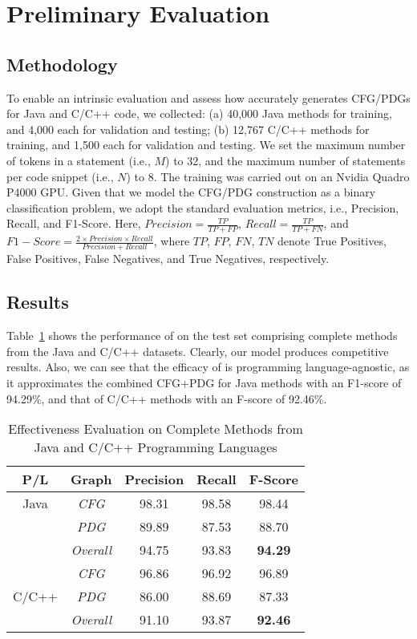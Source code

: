 \section{Preliminary Evaluation}
\subsection{Methodology}
To enable an intrinsic evaluation and assess how accurately \tool generates CFG/PDGs for Java and C/C++ code, we collected: (a) 40,000 Java methods for training, and 4,000 each for validation and testing; (b) 12,767 C/C++ methods for training, and 1,500 each for validation and testing. We set the maximum number of tokens in a statement (i.e., $M$) to 32, and the maximum number of statements per code snippet (i.e., $N$) to 8. The training was carried out on an Nvidia Quadro P4000 GPU. Given that we model the CFG/PDG construction as a binary classification problem, we adopt the standard evaluation metrics, i.e., Precision, Recall, and F1-Score. Here, $Precision = \frac{TP}{TP+FP}$, $Recall = \frac{TP}{TP+FN}$, and $F1{-}Score = \frac{2\times Precision\times Recall}{Precision+Recall}$, where $TP$, $FP$, $FN$, $TN$ denote True Positives, False Positives, False Negatives, and True Negatives, respectively.

\subsection{Results}

Table~\ref{tab:intrinsic} shows the performance of \tool on the test set comprising complete methods from the Java and C/C++ datasets. Clearly, our model produces competitive results. Also, we can see that the efficacy of \tool is programming language-agnostic, as it approximates the combined CFG+PDG
for Java methods with an F1-score of 94.29\%, and that of C/C++ methods with an F-score of 92.46\%.

\begin{table}[H]
  \centering
  \small
  \caption{Effectiveness Evaluation on Complete Methods from Java and C/C++ Programming Languages}
\begin{tabular}{c|c|c|c|c}
\hline
\textbf{P/L}         & \textbf{Graph}   & \textbf{Precision} & \textbf{Recall} & \textbf{F-Score} \\ \hline
Java                 & \textit{CFG}     & 98.31              & 98.58           & 98.44            \\
                     & \textit{PDG}     & 89.89              & 87.53           & 88.70            \\
                     & \textit{Overall} & 94.75            & 93.83           & \textbf{94.29}   \\
\hline
\multirow{3}{*}{C/C++} & \textit{CFG}     & 96.86            & 96.92         & 96.89           \\
                     & \textit{PDG}     & 86.00            & 88.69         & 87.33           \\
                     & \textit{Overall} & 91.10            & 93.87         & \textbf{92.46}  \\
\hline
\end{tabular}
\label{tab:intrinsic}
\end{table}

